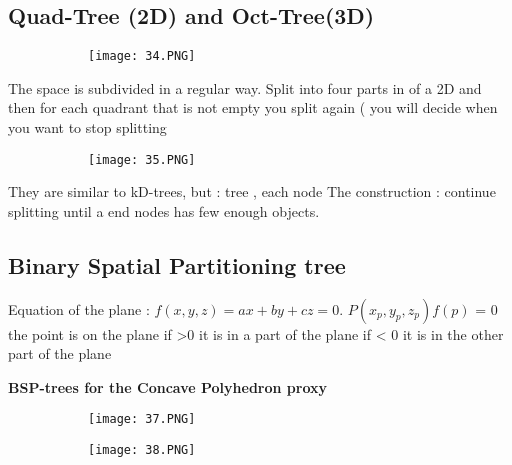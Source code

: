 \documentclass{article}
\begin{document}
\vspace{50mm}

\subsection{Quad-Tree (2D) and Oct-Tree(3D)}


\begin{figure}[ht!]
  \centering
  \begin{subfigure}[b]{0.4\linewidth}
    \texttt{[image: 34.PNG]}
  \end{subfigure}
\end{figure}

The space is subdivided in a regular way. Split into four parts in of a 2D and then for each quadrant that is not empty you split again ( you will decide when you want to stop splitting

\begin{figure}[ht!]
  \centering
  \begin{subfigure}[b]{0.4\linewidth}
    \texttt{[image: 35.PNG]}
  \end{subfigure}
\end{figure}

They are similar to kD-trees, but : tree , each node 
The construction : continue splitting until a end nodes has few enough objects.

\vspace{20mm}
\subsection{Binary Spatial Partitioning tree}

Equation of the plane : $f(x,y,z) = ax + by + cz = 0$.
$P(x_p,y_p,z_p) f(p)$ = 0 the point is on the plane if >0 it is in a part of the plane if < 0 it is in the other part of the plane

\vspace{3mm}
\textbf{BSP-trees for the Concave Polyhedron proxy}

\begin{figure}[ht!]
  \centering
  \begin{subfigure}[b]{0.2\linewidth}
    \texttt{[image: 37.PNG]}
  \end{subfigure}
  \begin{subfigure}[b]{0.5\textwidth}
         \centering
         \texttt{[image: 38.PNG]}
     \end{subfigure}
\end{figure}
\end{document}
